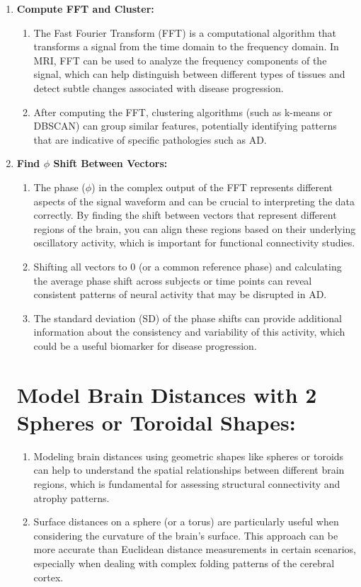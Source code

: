 \documentclass[twocolumn]{article}
\begin{document}
\begin{enumerate}

\item \textbf{Compute FFT and Cluster:}
  \begin{enumerate}
  \item The Fast Fourier Transform (FFT) is a computational algorithm that transforms a signal from the time domain to the frequency domain. In MRI, FFT can be
used to analyze the frequency components of the signal, which can help distinguish between different types of tissues and detect subtle changes
associated with disease progression.
  \item After computing the FFT, clustering algorithms (such as k-means or DBSCAN) can group similar features, potentially identifying patterns that are
indicative of specific pathologies such as AD.
  \end{enumerate}

\item \textbf{Find $\phi$ Shift Between Vectors:}
  \begin{enumerate}
  \item The phase ($\phi$) in the complex output of the FFT represents different aspects of the signal waveform and can be crucial to interpreting the
data correctly. By finding the shift between vectors that represent different regions of the brain, you can align these regions based on their underlying
oscillatory activity, which is important for functional connectivity studies.
  \item Shifting all vectors to 0 (or a common reference phase) and calculating the average phase shift across subjects or time points can reveal
consistent patterns of neural activity that may be disrupted in AD.
  \item The standard deviation (SD) of the phase shifts can provide additional information about the consistency and variability of this activity, which
could be a useful biomarker for disease progression.
  \end{enumerate}

\section{Model Brain Distances with 2 Spheres or Toroidal Shapes:}
  \begin{enumerate}
  \item Modeling brain distances using geometric shapes like spheres or toroids can help to understand the spatial relationships between different
brain regions, which is fundamental for assessing structural connectivity and atrophy patterns.
  \item Surface distances on a sphere (or a torus) are particularly useful when considering the curvature of the brain's surface. This approach can be
more accurate than Euclidean distance measurements in certain scenarios, especially when dealing with complex folding patterns of the cerebral cortex.
  \end{enumerate}


\end{enumerate}
\end{document}
